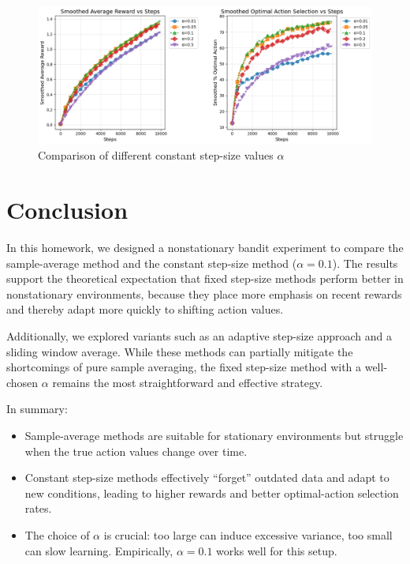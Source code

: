 \documentclass{article}
\begin{document}
\begin{figure}[h!]
\centering
\includegraphics[width=\linewidth]{figure6.png}
\caption{Comparison of different constant step-size values \(\alpha\)}
\label{fig:4.3}
\end{figure}








\section{Conclusion}

In this homework, we designed a nonstationary bandit experiment to compare the sample-average method and the constant step-size method (\(\alpha = 0.1\)). The results support the theoretical expectation that fixed step-size methods perform better in nonstationary environments, because they place more emphasis on recent rewards and thereby adapt more quickly to shifting action values. 

Additionally, we explored variants such as an adaptive step-size approach and a sliding window average. While these methods can partially mitigate the shortcomings of pure sample averaging, the fixed step-size method with a well-chosen \(\alpha\) remains the most straightforward and effective strategy.

In summary:
\begin{itemize}
    \item Sample-average methods are suitable for stationary environments but struggle when the true action values change over time.
    \item Constant step-size methods effectively ``forget'' outdated data and adapt to new conditions, leading to higher rewards and better optimal-action selection rates.
    \item The choice of \(\alpha\) is crucial: too large can induce excessive variance, too small can slow learning. Empirically, \(\alpha=0.1\) works well for this setup.
\end{itemize}



\end{document}
